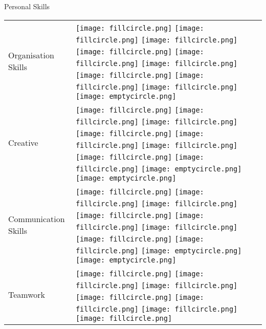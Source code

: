 \documentclass{resume}
\begin{document}
\begin{rSection}{Personal Skills}
\begin{table}[h!]
  \begin{tabular}{p{10cm}p{6cm}}
 	Organisation Skills & 
 	\texttt{[image: fillcircle.png]} 
    \texttt{[image: fillcircle.png]} 
    \texttt{[image: fillcircle.png]}
    \texttt{[image: fillcircle.png]} 
    \texttt{[image: fillcircle.png]}
    \texttt{[image: fillcircle.png]} 
    \texttt{[image: fillcircle.png]}
    \texttt{[image: fillcircle.png]} 
    \texttt{[image: fillcircle.png]} 
	\texttt{[image: emptycircle.png]} \\
 	Creative & 
 	\texttt{[image: fillcircle.png]} 
    \texttt{[image: fillcircle.png]} 
    \texttt{[image: fillcircle.png]}
    \texttt{[image: fillcircle.png]} 
    \texttt{[image: fillcircle.png]}
    \texttt{[image: fillcircle.png]} 
    \texttt{[image: fillcircle.png]}
    \texttt{[image: fillcircle.png]} 
    \texttt{[image: emptycircle.png]} 
	\texttt{[image: emptycircle.png]}\\
 	Communication Skills & 
 	\texttt{[image: fillcircle.png]} 
    \texttt{[image: fillcircle.png]} 
    \texttt{[image: fillcircle.png]}
    \texttt{[image: fillcircle.png]} 
    \texttt{[image: fillcircle.png]}
    \texttt{[image: fillcircle.png]} 
    \texttt{[image: fillcircle.png]}
    \texttt{[image: fillcircle.png]} 
    \texttt{[image: emptycircle.png]} 
	\texttt{[image: emptycircle.png]}\\
 	Teamwork & 
 	\texttt{[image: fillcircle.png]} 
    \texttt{[image: fillcircle.png]} 
    \texttt{[image: fillcircle.png]}
    \texttt{[image: fillcircle.png]} 
    \texttt{[image: fillcircle.png]}
    \texttt{[image: fillcircle.png]} 
    \texttt{[image: fillcircle.png]}

\end{tabular}
\end{table}
\end{rSection}
\end{document}

